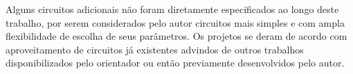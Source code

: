 Alguns circuitos adicionais não foram diretamente especificados ao longo deste trabalho, por serem considerados pelo autor circuitos mais simples e com ampla flexibilidade de escolha de seus par\^ametros. Os projetos se deram de acordo com aproveitamento de circuitos j\'a existentes advindos de outros trabalhos disponibilizados pelo orientador ou então previamente desenvolvidos pelo autor.









